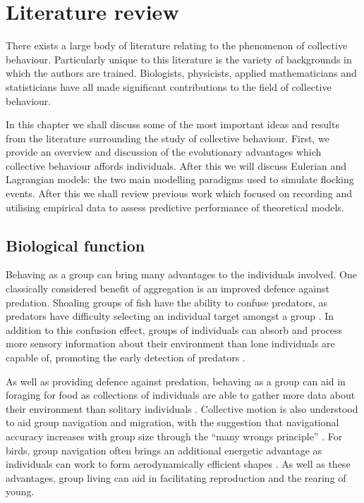\graphicspath{{fig/lit_review/}}

\chapter{Literature review}
\label{cha:lit_review}

There exists a large body of literature relating to the phenomenon of collective
behaviour. Particularly unique to this literature is the variety of backgrounds
in which the authors are trained. Biologists, physicists, applied
mathematicians and statisticians have all made significant contributions to the
field of collective behaviour.

In this chapter we shall discuss some of the most important ideas and results
from the literature surrounding the study of collective behaviour. First, we
provide an overview and discussion of the evolutionary advantages which
collective behaviour affords individuals. After this we will discuss Eulerian
and Lagrangian models: the two main modelling paradigms used to simulate
flocking events. After this we shall review previous work which focused on
recording and utilising empirical data to assess predictive performance of
theoretical models.

\section{Biological function}
\label{sec:biological_function}

Behaving as a group can bring many advantages to the individuals involved. One
classically considered benefit of aggregation is an improved defence against
predation. Shoaling groups of fish have the ability to confuse predators, as
predators have difficulty selecting an individual target amongst a group
\parencite{landeau86}. In addition to this confusion effect, groups of
individuals can absorb and process more sensory information about their
environment than lone individuals are capable of, promoting the early detection
of predators \parencite{pitcher93}.

As well as providing defence against predation, behaving as a group can aid in
foraging for food as collections of individuals are able to gather more data
about their environment than solitary individuals \parencite{clark86}.
Collective motion is also understood to aid group navigation and migration,
with the suggestion that navigational accuracy increases with group size
through the ``many wrongs principle'' \parencite{simmons04}. For birds, group
navigation often brings an additional energetic advantage as individuals can
work to form aerodynamically efficient shapes \parencite{weimerskirch01}. As
well as these advantages, group living can aid in facilitating reproduction and
the rearing of young.

